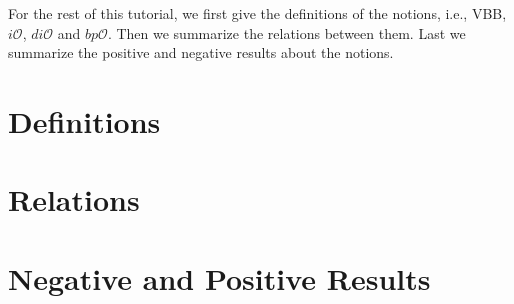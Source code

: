 \documentclass[12pt]{article}
\newcommand{\io}{i\mathcal{O}}
\newcommand{\dio}{di\mathcal{O}}
\newcommand{\bpo}{bp\mathcal{O}}
\theoremstyle{definition}
\begin{document}
For the rest of this tutorial, we first give the definitions of the notions, i.e., VBB, $\io$, $\dio$ and $\bpo$. Then we summarize the relations between them. Last we summarize the positive and negative results about the notions.

\section{Definitions}

\section{Relations}

\section{Negative and Positive Results}



	
\end{document}
